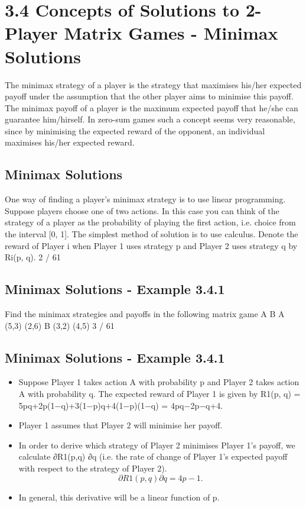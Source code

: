 \documentclass[]{report}
\begin{document}
\section{3.4 Concepts of Solutions to 2-Player Matrix Games -
Minimax Solutions}
The minimax strategy of a player is the strategy that maximises
his/her expected payoff under the assumption that the other player
aims to minimise this payoff.
The minimax payoff of a player is the maximum expected payoff
that he/she can guarantee him/hirself.
In zero-sum games such a concept seems very reasonable, since by
minimising the expected reward of the opponent, an individual
maximises his/her expected reward.
\subsection{Minimax Solutions}
One way of finding a player’s minimax strategy is to use linear
programming.
Suppose players choose one of two actions. In this case you can
think of the strategy of a player as the probability of playing the
first action, i.e. choice from the interval [0, 1]. The simplest
method of solution is to use calculus.
Denote the reward of Player i when Player 1 uses strategy p and
Player 2 uses strategy q by Ri(p, q).
2 / 61
\subsection{Minimax Solutions - Example 3.4.1}
Find the minimax strategies and payoffs in the following matrix
game
A B
A (5,3) (2,6)
B (3,2) (4,5)
3 / 61
\subsection{Minimax Solutions - Example 3.4.1}
\begin{itemize}
	\item Suppose Player 1 takes action A with probability p and Player 2
	takes action A with probability q. The expected reward of Player 1
	is given by
	R1(p, q) = 5pq+2p(1−q)+3(1−p)q+4(1−p)(1−q) = 4pq−2p−q+4.
	\item Player 1 assumes that Player 2 will minimise her payoff. 
		\item In order to
	derive which strategy of Player 2 minimises Player 1’s payoff, we
	calculate ∂R1(p,q)
	∂q
	(i.e. the rate of change of Player 1’s expected
	payoff with respect to the strategy of Player 2).
	\[∂R1(p, q)
	∂q
	= 4p − 1.\]
	\item	In general, this derivative will be a linear function of p.
\end{itemize}
\end{document}
